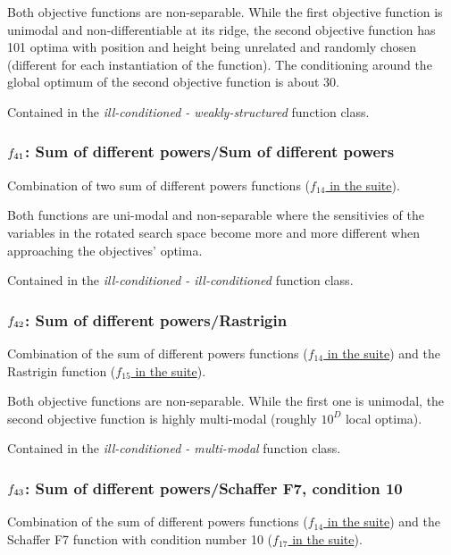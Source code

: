 \documentclass[letterpaper,12pt,english]{article}
\begin{document}
Both objective functions are non-separable.
While the first objective function is unimodal and non-differentiable at
its ridge, the second objective function
has 101 optima with position and height being unrelated and randomly
chosen (different for each instantiation of the function). The
conditioning around the global optimum of the second objective function
is about 30.

Contained in the \emph{ill-conditioned - weakly-structured} function class.


\subsubsection{\protect\(f_{41}\protect\): Sum of different powers/Sum of different powers}
\label{index:f41}\label{index:sum-of-different-powers-sum-of-different-powers}
Combination of two sum of different powers functions
(\href{http://coco.lri.fr/downloads/download15.03/bbobdocfunctions.pdf\#page=70}{\(f_{14}\) in the  suite}).

Both functions are uni-modal and non-separable where the sensitivies of
the variables in the rotated search space become more and more different
when approaching the objectives' optima.

Contained in the \emph{ill-conditioned - ill-conditioned} function class.


\subsubsection{\protect\(f_{42}\protect\): Sum of different powers/Rastrigin}
\label{index:f42}\label{index:sum-of-different-powers-rastrigin}
Combination of the sum of different powers functions
(\href{http://coco.lri.fr/downloads/download15.03/bbobdocfunctions.pdf\#page=70}{\(f_{14}\) in the  suite}) and the Rastrigin function
(\href{http://coco.lri.fr/downloads/download15.03/bbobdocfunctions.pdf\#page=75}{\(f_{15}\) in the  suite}).

Both objective functions are non-separable. While the first one
is unimodal, the second objective
function is highly multi-modal (roughly \(10^D\) local optima).

Contained in the \emph{ill-conditioned - multi-modal} function class.


\subsubsection{\protect\(f_{43}\protect\): Sum of different powers/Schaffer F7, condition 10}
\label{index:sum-of-different-powers-schaffer-f7-condition-10}\label{index:f43}
Combination of the sum of different powers functions
(\href{http://coco.lri.fr/downloads/download15.03/bbobdocfunctions.pdf\#page=70}{\(f_{14}\) in the  suite}) and the Schaffer F7 function with
condition number 10 (\href{http://coco.lri.fr/downloads/download15.03/bbobdocfunctions.pdf\#page=85}{\(f_{17}\) in the  suite}).
\end{document}
